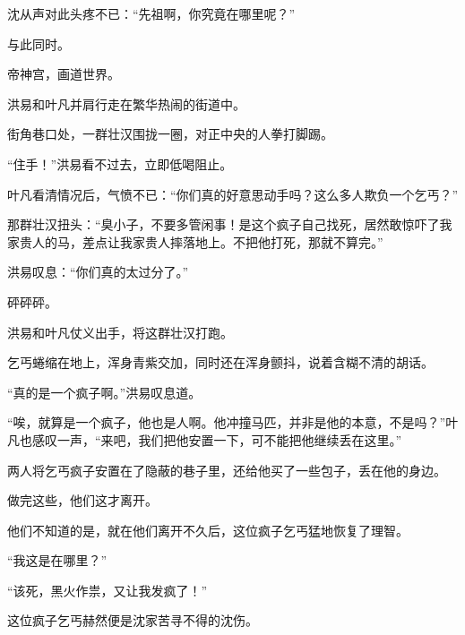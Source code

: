 \begin{this_body}
沈从声对此头疼不已：“先祖啊，你究竟在哪里呢？”

与此同时。

帝神宫，画道世界。

洪易和叶凡并肩行走在繁华热闹的街道中。

街角巷口处，一群壮汉围拢一圈，对正中央的人拳打脚踢。

“住手！”洪易看不过去，立即低喝阻止。

叶凡看清情况后，气愤不已：“你们真的好意思动手吗？这么多人欺负一个乞丐？”

那群壮汉扭头：“臭小子，不要多管闲事！是这个疯子自己找死，居然敢惊吓了我家贵人的马，差点让我家贵人摔落地上。不把他打死，那就不算完。”

洪易叹息：“你们真的太过分了。”

砰砰砰。

洪易和叶凡仗义出手，将这群壮汉打跑。

乞丐蜷缩在地上，浑身青紫交加，同时还在浑身颤抖，说着含糊不清的胡话。

“真的是一个疯子啊。”洪易叹息道。

“唉，就算是一个疯子，他也是人啊。他冲撞马匹，并非是他的本意，不是吗？”叶凡也感叹一声，“来吧，我们把他安置一下，可不能把他继续丢在这里。”

两人将乞丐疯子安置在了隐蔽的巷子里，还给他买了一些包子，丢在他的身边。

做完这些，他们这才离开。

他们不知道的是，就在他们离开不久后，这位疯子乞丐猛地恢复了理智。

“我这是在哪里？”

“该死，黑火作祟，又让我发疯了！”

这位疯子乞丐赫然便是沈家苦寻不得的沈伤。

\end{this_body}

